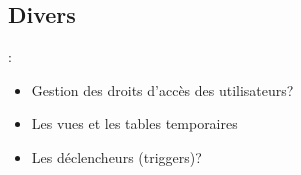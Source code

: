 \documentclass[10pt]{beamer}
\begin{document}
\subsection{Divers}
\begin{frame}{\secname : \subsecname}
    \begin{itemize}
        \item Gestion des droits d’accès des utilisateurs?
        \item Les vues et les tables temporaires
        \item Les déclencheurs (triggers)?
    \end{itemize}
\end{frame}


\end{document}
